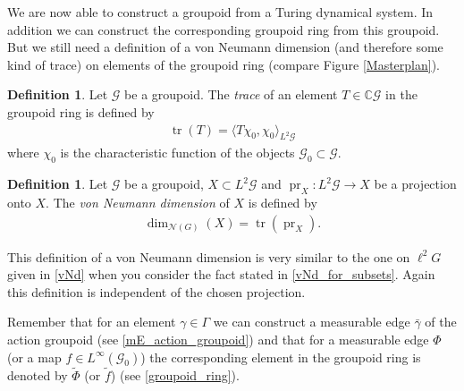 \documentclass[12pt,a4paper]{scrartcl}
\theoremstyle{plain}
\theoremstyle{definition}
\newtheorem{Definition}[Theorem]{Definition}
\newcommand{\C}{\mathbb{C}} %
\newcommand{\2}{\mathbb{Z} / 2 \mathbb{Z}}
\newcommand{\G}{\mathcal{G}}
\newcommand{\1}{\bar{1}}
\newcommand{\0}{\bar{0}}
\newcommand{\tr}{\operatorname{tr}}
\newcommand{\pr}{\operatorname{pr}}
\begin{document}
We are now able to construct a groupoid from a Turing dynamical system. In addition we can construct the corresponding groupoid ring from this groupoid. But we still need a definition of a von Neumann dimension (and therefore some kind of trace) on elements of the groupoid ring (compare Figure \ref{Masterplan}).
\begin{Definition}
	Let $\G$ be a groupoid. The \emph{trace} of an element $T \in \C \G$ in the groupoid ring is defined by
	\begin{align*}
		\tr(T) = \langle T \chi_0, \chi_0 \rangle_{L^2 \G}
	\end{align*}
	where $\chi_0$ is the characteristic function of the objects $\G_0 \subset \G$.
\end{Definition}
\begin{Definition} \label{vNd_of_groupoids}
	Let $\G$ be a groupoid, $X \subset L^2 \G$ and $\pr_X\colon L^2 \G \to X$ be a projection onto $X$. The \emph{von Neumann dimension} of $X$ is defined by
	\begin{align*}
		\dim_{\mathcal{N}(G)}(X) = \tr(\pr_X).
	\end{align*}
\end{Definition}
This definition of a von Neumann dimension is very similar to the one on $\ell^2 G$ given in \ref{vNd} when you consider the fact stated in \ref{vNd_for_subsets}. Again this definition is independent of the chosen projection.

Remember that for an element $\gamma \in \Gamma$ we can construct a measurable edge $\bar{\gamma}$ of the action groupoid (see \ref{mE_action_groupoid}) and that for a measurable edge $\Phi$ (or a map $f \in L^\infty (\G_0)$) the corresponding element in the groupoid ring is denoted by $\tilde{\Phi}$ (or $\tilde{f}$) (see \ref{groupoid_ring}).
\end{document}
